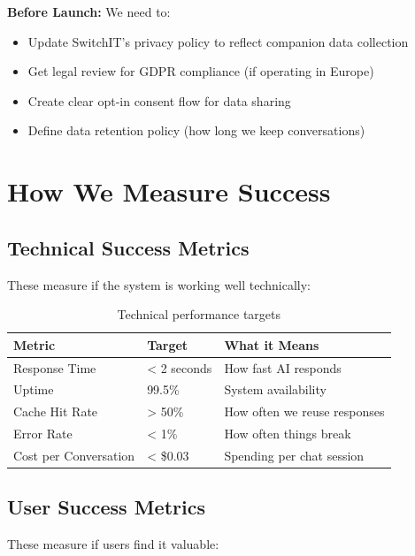 \documentclass[12pt,a4paper]{article}
\begin{document}
\begin{warning}
\textbf{Before Launch:} We need to:
\begin{itemize}
  \item Update SwitchIT's privacy policy to reflect companion data collection
  \item Get legal review for GDPR compliance (if operating in Europe)
  \item Create clear opt-in consent flow for data sharing
  \item Define data retention policy (how long we keep conversations)
\end{itemize}
\end{warning}

\section{How We Measure Success}

\subsection{Technical Success Metrics}

These measure if the system is working well technically:

\begin{table}[h]
\centering
\begin{tabular}{|l|l|l|}
\hline
\textbf{Metric} & \textbf{Target} & \textbf{What it Means} \\
\hline
Response Time & < 2 seconds & How fast AI responds \\
Uptime & 99.5\% & System availability \\
Cache Hit Rate & > 50\% & How often we reuse responses \\
Error Rate & < 1\% & How often things break \\
Cost per Conversation & < \$0.03 & Spending per chat session \\
\hline
\end{tabular}
\caption{Technical performance targets}
\end{table}

\subsection{User Success Metrics}

These measure if users find it valuable:
\end{document}
